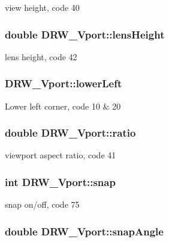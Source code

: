 view height, code 40 \hypertarget{classDRW__Vport_a9d3e2b640f9f9791d50b00f5cae452f9}{
\subsubsection[{lens\-Height}]{\setlength{\rightskip}{0pt plus 5cm}double D\-R\-W\-\_\-\-Vport\-::lens\-Height}}\label{classDRW__Vport_a9d3e2b640f9f9791d50b00f5cae452f9}
lens height, code 42 \hypertarget{classDRW__Vport_a27df49d3aacabe83be11ac29463f75c1}{
\subsubsection[{lower\-Left}]{ D\-R\-W\-\_\-\-Vport\-::lower\-Left}}\label{classDRW__Vport_a27df49d3aacabe83be11ac29463f75c1}
Lower left corner, code 10 \& 20 \hypertarget{classDRW__Vport_ab84331826a4e1bd181eb2ca6a55e4a97}{
\subsubsection[{ratio}]{\setlength{\rightskip}{0pt plus 5cm}double D\-R\-W\-\_\-\-Vport\-::ratio}}\label{classDRW__Vport_ab84331826a4e1bd181eb2ca6a55e4a97}
viewport aspect ratio, code 41 \hypertarget{classDRW__Vport_a9a358c56a549eba62bb326fdcc510bb2}{
\subsubsection[{snap}]{\setlength{\rightskip}{0pt plus 5cm}int D\-R\-W\-\_\-\-Vport\-::snap}}\label{classDRW__Vport_a9a358c56a549eba62bb326fdcc510bb2}
snap on/off, code 75 \hypertarget{classDRW__Vport_a1709ba5680cf5b0bf9c7b41bab479225}{
\subsubsection[{snap\-Angle}]{\setlength{\rightskip}{0pt plus 5cm}double D\-R\-W\-\_\-\-Vport\-::snap\-Angle}}\label{classDRW__Vport_a1709ba5680cf5b0bf9c7b41bab479225}
